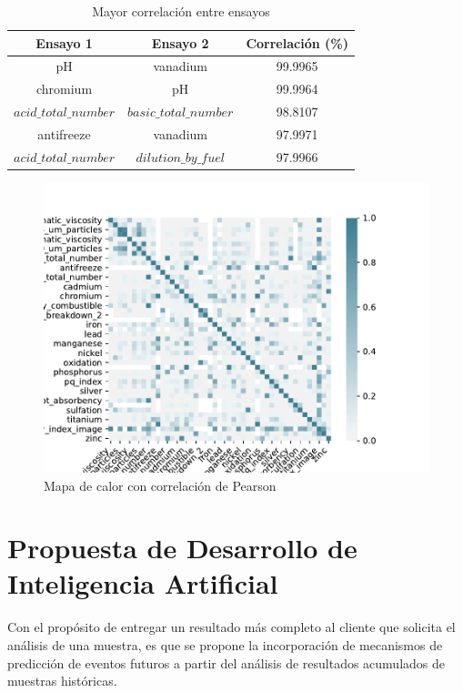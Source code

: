 \documentclass{article}
\begin{document}
\begin{table}[!htbp]
\begin{tabular}{|c|c|c|}
\hline 
Ensayo 1 & Ensayo 2 & Correlación (\%) \\ 
\hline 
pH & vanadium & 99.9965 \\ 
\hline 
chromium & pH & 99.9964 \\ 
\hline 
$acid\_total\_number$ & $basic\_total\_number$ & 98.8107 \\ 
\hline 
antifreeze & vanadium & 97.9971 \\ 
\hline 
$acid\_total\_number$ & $dilution\_by\_fuel$ & 97.9966 \\ 
\hline 
\end{tabular}
\caption{Mayor correlaci\'on entre ensayos}
\label{tab:corr} 
\end{table}

\begin{figure}[!htbp]
\centering
\includegraphics[width=\textwidth]{figs/heatmap.pdf}
\caption{Mapa de calor con correlaci\'on de Pearson}
\label{fig:heatmap}
\end{figure}

\newpage
\section{Propuesta de Desarrollo de Inteligencia Artificial}

Con el propósito de entregar un resultado más completo al cliente que solicita el análisis de una muestra, es que se propone la incorporación de mecanismos de predicción de eventos futuros a partir del análisis de resultados acumulados de muestras históricas. 
\end{document}
